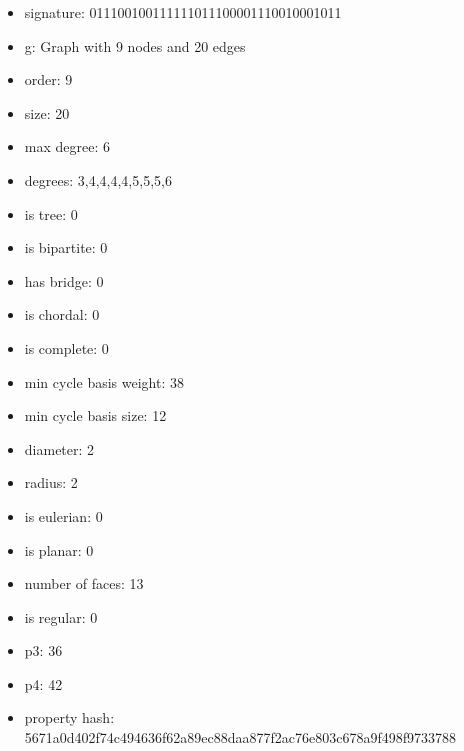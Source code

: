 \newpage
\begin{figure}
\end{figure}
\begin{itemize}
\item signature: 011100100111111011100001110010001011
\item g: Graph with 9 nodes and 20 edges
\item order: 9
\item size: 20
\item max degree: 6
\item degrees: 3,4,4,4,4,5,5,5,6
\item is tree: 0
\item is bipartite: 0
\item has bridge: 0
\item is chordal: 0
\item is complete: 0
\item min cycle basis weight: 38
\item min cycle basis size: 12
\item diameter: 2
\item radius: 2
\item is eulerian: 0
\item is planar: 0
\item number of faces: 13
\item is regular: 0
\item p3: 36
\item p4: 42
\item property hash: 5671a0d402f74c494636f62a89ec88daa877f2ac76e803c678a9f498f9733788
\end{itemize}
